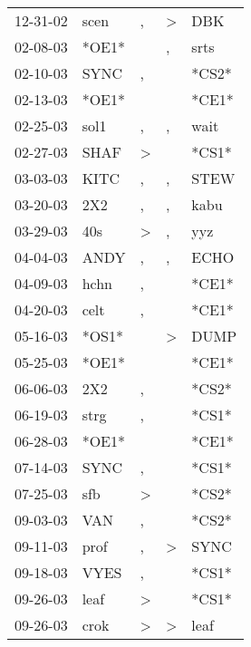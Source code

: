 \begin{supertabular}{lllll}
 12-31-02 &   scen &                , &     \textgreater &    DBK \\
 02-08-03 &  *OE1* &                  &                , &   srts \\
 02-10-03 &   SYNC &                , &                  &  *CS2* \\
 02-13-03 &  *OE1* &                  &                  &  *CE1* \\
 02-25-03 &   sol1 &                , &                , &   wait \\
 02-27-03 &   SHAF &     \textgreater &                  &  *CS1* \\
 03-03-03 &   KITC &                , &                , &   STEW \\
 03-20-03 &    2X2 &                , &                , &   kabu \\
 03-29-03 &    40s &     \textgreater &                , &    yyz \\
 04-04-03 &   ANDY &                , &                , &   ECHO \\
 04-09-03 &   hchn &                , &                  &  *CE1* \\
 04-20-03 &   celt &                , &                  &  *CE1* \\
 05-16-03 &  *OS1* &                  &     \textgreater &   DUMP \\
 05-25-03 &  *OE1* &                  &                  &  *CE1* \\
 06-06-03 &    2X2 &                , &                  &  *CS2* \\
 06-19-03 &   strg &                , &                  &  *CS1* \\
 06-28-03 &  *OE1* &                  &                  &  *CE1* \\
 07-14-03 &   SYNC &                , &                  &  *CS1* \\
 07-25-03 &    sfb &     \textgreater &                  &  *CS2* \\
 09-03-03 &    VAN &                , &                  &  *CS2* \\
 09-11-03 &   prof &                , &     \textgreater &   SYNC \\
 09-18-03 &   VYES &                , &                  &  *CS1* \\
 09-26-03 &   leaf &     \textgreater &                  &  *CS1* \\
 09-26-03 &   crok &     \textgreater &     \textgreater &   leaf \\

\end{supertabular}
